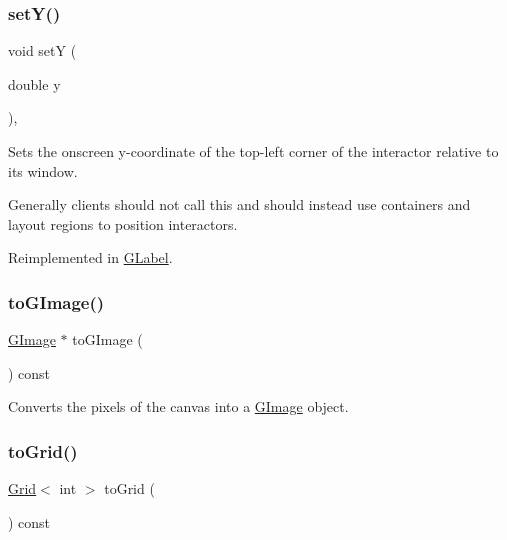 \subsubsection{\texorpdfstring{set\+Y()}{setY()}}
{\footnotesize\ttfamily void setY (\begin{DoxyParamCaption}\item[{double}]{y }\end{DoxyParamCaption})\hspace{0.3cm}{\ttfamily [virtual]}, {\ttfamily [inherited]}}



Sets the onscreen y-\/coordinate of the top-\/left corner of the interactor relative to its window. 

Generally clients should not call this and should instead use containers and layout regions to position interactors. 

Reimplemented in \mbox{\hyperlink{classGLabel_a59633abb35b676c54d88ea6cd384fc55}{G\+Label}}.

\mbox{\label{classGCanvas_aa2b5affed24054a09bddfe568d11200b}} 
\subsubsection{\texorpdfstring{to\+G\+Image()}{toGImage()}}
{\footnotesize\ttfamily \mbox{\hyperlink{classGImage}{G\+Image}} $\ast$ to\+G\+Image (\begin{DoxyParamCaption}{ }\end{DoxyParamCaption}) const\hspace{0.3cm}{\ttfamily [virtual]}}



Converts the pixels of the canvas into a \mbox{\hyperlink{classGImage}{G\+Image}} object. 

\mbox{\label{classGCanvas_a2f9b15856aaf66aa95cfd7405bd972cc}} 
\subsubsection{\texorpdfstring{to\+Grid()}{toGrid()}\hspace{0.1cm}{\footnotesize\ttfamily [1/2]}}
{\footnotesize\ttfamily \mbox{\hyperlink{classGrid}{Grid}}$<$ int $>$ to\+Grid (\begin{DoxyParamCaption}{ }\end{DoxyParamCaption}) const\hspace{0.3cm}{\ttfamily [virtual]}}



